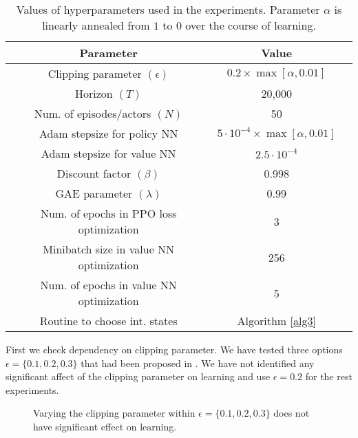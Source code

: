 \documentclass[11pt]{article}
\theoremstyle{definition}
\numberwithin{equation}{section}
\begin{document}
\begin{table}[!ht]
\centering%
\begin{tabular}{|c|c|c|}
  \hline
  Parameter  & Value\\\hline
  Clipping parameter $(\epsilon)$ & $0.2\times \max[ \alpha,0.01]$ \\
  Horizon $(T)$ & 20,000 \\
  Num. of episodes/actors $(N)$  & 50 \\
  Adam stepsize for policy NN& $5\cdot 10^{-4}\times \max[ \alpha,0.01]  $   \\
  Adam stepsize for value NN& $2.5\cdot 10^{-4}  $ \\
  Discount factor $(\beta)$  & 0.998  \\
  GAE parameter $(\lambda)$  & 0.99 \\
  Num. of epochs in PPO loss optimization& 3\\
  Minibatch size in value  NN optimization & 256\\
   Num. of epochs in value  NN optimization & 5\\
  Routine to choose int. states & Algorithm \ref{alg3}\\
\end{tabular}
\caption[]{Values of hyperparameters used in the experiments. Parameter $\alpha$ is linearly annealed from $1$ to $0$ over the course of learning.}\label{tab:par}
\end{table}

First we check dependency on clipping parameter. We have tested three options $\epsilon = \{0.1,0.2, 0.3\}$ that had been proposed in \cite{Schulman2017}. We have not identified any significant affect of the clipping parameter on learning and use $\epsilon = 0.2$ for the rest experiments.






   \begin{figure}[!ht]
     \hfill
     \caption{ Varying the clipping parameter within $\epsilon = \{0.1, 0.2, 0.3\}$ does not have  significant effect on learning.}
     \label{fig:clip}
   \end{figure}
\end{document}
